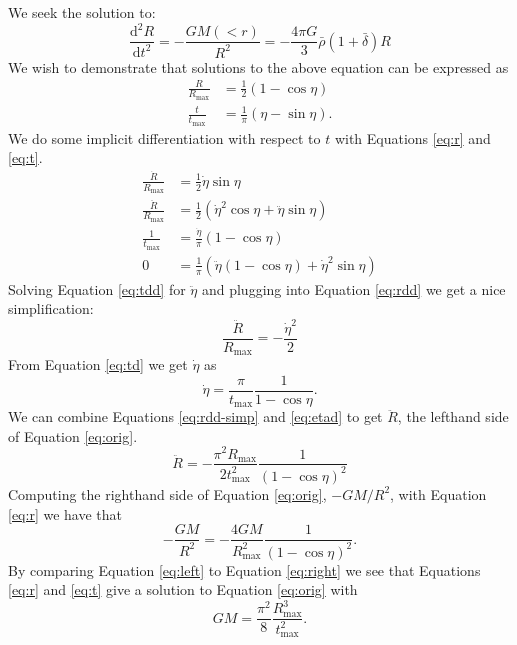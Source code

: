 \begin{enumerate}
\begin{enumerate}
\begin{answer}
We seek the solution to:
\begin{equation}\label{eq:orig}
  \frac{\mathrm d^2 R}{\mathrm dt^2}=-\frac{GM(<r)}{R^2}=-\frac{4\pi G}{3}\bar\rho(1+\bar\delta)R
\end{equation}
We wish to demonstrate that solutions to the above equation can be expressed as
\begin{align}
  \frac{R}{R_\text{max}}&=\frac{1}{2}(1-\cos\eta)\label{eq:r} \\
  \frac{t}{t_\text{max}}&=\frac{1}{\pi}(\eta-\sin\eta)\label{eq:t}.
\end{align}
We do some implicit differentiation with respect to $t$ with
Equations \ref{eq:r} and \ref{eq:t}.
\begin{align}
  \frac{\dot R}{R_\text{max}}&=\frac{1}{2}\dot\eta\sin\eta\label{eq:rd} \\
  \frac{\ddot R}{R_\text{max}}&=\frac{1}{2}(\dot\eta^2\cos\eta+\ddot\eta\sin\eta)\label{eq:rdd} \\
  \frac{1}{t_\text{max}}&=\frac{\dot\eta}{\pi}(1-\cos\eta)\label{eq:td} \\
  0&=\frac{1}{\pi}(\ddot\eta(1-\cos\eta)+\dot\eta^2\sin\eta)\label{eq:tdd}
\end{align}
Solving Equation \ref{eq:tdd} for $\ddot\eta$ and plugging into Equation \ref{eq:rdd} we get a nice simplification:
\begin{equation}
  \frac{\ddot R}{R_\text{max}}=-\frac{\dot\eta^2}{2}\label{eq:rdd-simp}
\end{equation}
From Equation \ref{eq:td} we get $\dot\eta$ as
\begin{equation}
  \dot\eta=\frac{\pi}{t_\text{max}}\frac{1}{1-\cos\eta}\label{eq:etad}.
\end{equation}
We can combine Equations \ref{eq:rdd-simp} and \ref{eq:etad} to get $\ddot R$, the lefthand side of Equation \ref{eq:orig}.
\begin{equation}
  \ddot R=-\frac{\pi^2 R_\text{max}}{2t_\text{max}^2}\frac{1}{(1-\cos\eta)^2}\label{eq:left}
\end{equation}
Computing the righthand side of Equation \ref{eq:orig}, $-GM/R^2$, with Equation \ref{eq:r} we have that
\begin{equation}
  -\frac{GM}{R^2}=-\frac{4GM}{R_\text{max}^2}\frac{1}{(1-\cos\eta)^2}\label{eq:right}.
\end{equation}
By comparing Equation \ref{eq:left} to Equation \ref{eq:right} we see
that Equations \ref{eq:r} and \ref{eq:t} give a solution to
Equation \ref{eq:orig} with
\begin{equation}
  GM=\frac{\pi^2}{8}\frac{R_\text{max}^3}{t_\text{max}^2}.
\end{equation}
\end{answer}


\end{enumerate}
\end{enumerate}
